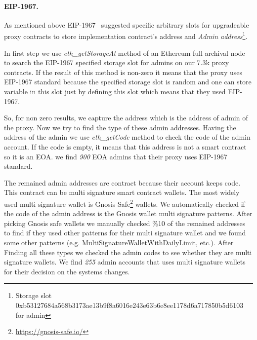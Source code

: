 \paragraph{EIP-1967.}As mentioned above EIP-1967~\cite{eip1967} suggested specific arbitrary slots for upgradeable proxy contracts to store implementation contract's address and \textit{Admin address}\footnote{Storage slot 0xb53127684a568b3173ae13b9f8a6016e243e63b6e8ee1178d6a717850b5d6103 for admin}.


In first step we use \textit{eth\_getStorageAt} method of an Ethereum full archival node to search the EIP-1967 specified storage slot for admins on our 7.3k proxy contracts. If the result of this method is non-zero it means that the proxy uses EIP-1967 standard because the specified storage slot is random and one can store variable in this slot just by defining this slot which means that they used EIP-1967.


So, for non zero results, we capture the address which is the address of admin of the proxy. Now we try to find the type of these admin addresses. Having the address of the admin we use \textit{eth\_getCode} method to check the code of the admin account. If the code is empty, it means that this address is not a smart contract so it is an EOA. we find \textit{900} EOA admins that their proxy uses EIP-1967 standard.

The remained admin addresses are contract because their account keeps code. This contract can be multi signature smart contract wallets. The most widely used multi signature wallet is Gnosis Safe\footnote{\url{https://gnosis-safe.io/}} wallets. We automatically checked if the code of the admin address is the Gnosis wallet multi signature patterns. After picking Gnosis safe wallets we manually checked \%10 of the remained addresses to find if they used other patterns for their multi signature wallet and we found some other patterns (e.g. MultiSignatureWalletWithDailyLimit, etc.). After Finding all these types we checked the admin codes to see whether they are multi signature wallets. We find \textit{255} admin accounts that uses multi signature wallets for their decision on the systems changes.


